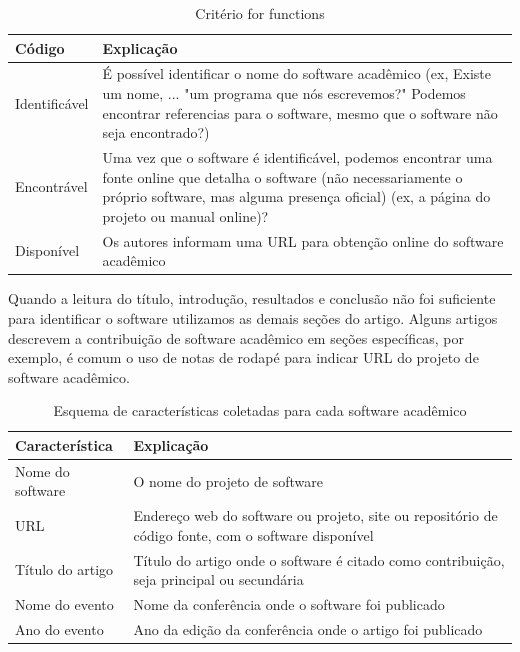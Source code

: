\begin{table}[h]
\caption{Critério for functions \cite{howison2016software}}
\centering
\begin{tabular}{ l p{12cm} }
  \hline
  Código           & Explicação \\
  \hline
  Identificável    & É possível identificar o nome do software acadêmico (ex, Existe um nome, ... "um programa que nós escrevemos?" Podemos encontrar referencias para o software, mesmo que o software não seja encontrado?) \\
  Encontrável      & Uma vez que o software é identificável, podemos encontrar uma fonte online que detalha o software (não necessariamente o próprio software, mas alguma presença oficial) (ex, a página do projeto ou manual online)? \\
  Disponível       & Os autores informam uma URL para obtenção online do software acadêmico \\
  \hline
\end{tabular}
\label{codes-for-selecao}
\end{table}

Quando a leitura do título, introdução, resultados e conclusão não foi suficiente
para identificar o software utilizamos as demais seções do artigo. Alguns
artigos descrevem a contribuição de software acadêmico em seções específicas,
por exemplo, é comum o uso de notas de rodapé para indicar URL do projeto de
software acadêmico.

\begin{table}[h]
\caption{Esquema de características coletadas para cada software acadêmico}
\centering
\begin{tabular}{ l p{11cm} }
  \hline
  Característica           & Explicação \\
  \hline
  Nome do software         & O nome do projeto de software \\
  URL                      & Endereço web do software ou projeto, site ou repositório de código fonte, com o software disponível \\
  Título do artigo         & Título do artigo onde o software é citado como contribuição, seja principal ou secundária \\
  Nome do evento           & Nome da conferência onde o software foi publicado \\
  Ano do evento            & Ano da edição da conferência onde o artigo foi publicado \\
  \hline
\end{tabular}
\label{coding-scheme-software-1}
\end{table}

